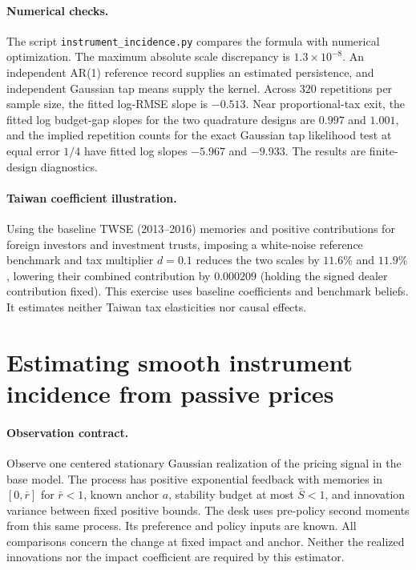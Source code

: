 \documentclass[12pt]{article}
\theoremstyle{definition}
\theoremstyle{remark}
\begin{document}
\paragraph{Numerical checks.} The script \nolinkurl{instrument_incidence.py} compares the formula with numerical optimization. The maximum absolute scale discrepancy is $1.3 \times 10^{-8}$. An independent AR(1) reference record supplies an estimated persistence, and independent Gaussian tap means supply the kernel. Across $320$ repetitions per sample size, the fitted log-RMSE slope is $-0.513$. Near proportional-tax exit, the fitted log budget-gap slopes for the two quadrature designs are $0.997$ and $1.001$, and the implied repetition counts for the exact Gaussian tap likelihood test at equal error $1/4$ have fitted log slopes $-5.967$ and $-9.933$. The results are finite-design diagnostics.

\paragraph{Taiwan coefficient illustration.} Using the baseline TWSE (2013--2016) memories and positive contributions for foreign investors and investment trusts, imposing a white-noise reference benchmark and tax multiplier $d=0.1$ reduces the two scales by $11.6\%$ and $11.9\%$, lowering their combined contribution by $0.000209$ (holding the signed dealer contribution fixed). This exercise uses baseline coefficients and benchmark beliefs. It estimates neither Taiwan tax elasticities nor causal effects.


\section{Estimating smooth instrument incidence from passive prices}\label{app:passiveincidence}

\paragraph{Observation contract.}
Observe one centered stationary Gaussian realization of the pricing signal in
the base model. The process has positive exponential feedback with memories in
$[0,\bar r]$ for $\bar r<1$, known anchor $a$, stability budget at most $\bar S<1$,
and innovation variance between fixed positive bounds. The desk uses pre-policy
second moments from this same process. Its preference and policy inputs are
known. All comparisons concern the change at fixed impact and anchor. Neither the
realized innovations nor the impact coefficient are required by this estimator.
\end{document}

